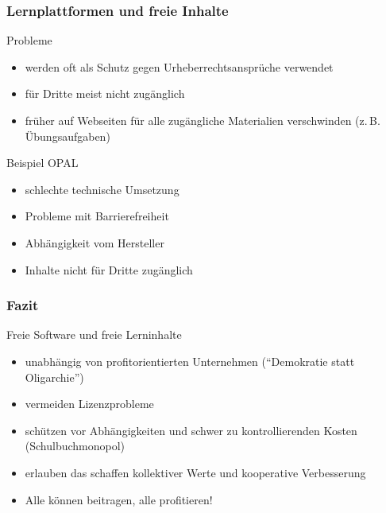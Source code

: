\documentclass{beamer}
\begin{document}
\begin{frame}
  \frametitle{Lernplattformen und freie Inhalte}
  \begin{block}{Probleme}
    \begin{itemize}
    \item werden oft als Schutz gegen Urheberrechtsansprüche verwendet
    \item für Dritte meist nicht zugänglich
    \item früher auf Webseiten für alle zugängliche Materialien
      verschwinden (z.\,B. Übungsaufgaben)
    \end{itemize}
  \end{block}

  \begin{block}{Beispiel OPAL}
    \begin{itemize}
    \item schlechte technische Umsetzung
    \item Probleme mit Barrierefreiheit
    \item Abhängigkeit vom Hersteller
    \item Inhalte nicht für Dritte zugänglich
    \end{itemize}
  \end{block}

\end{frame}

\begin{frame}
  \frametitle{Fazit}
  \begin{block}{Freie Software und freie Lerninhalte}
    \begin{itemize}
    \item unabhängig von profitorientierten Unternehmen
      (\enquote{Demokratie statt Oligarchie})
    \item vermeiden Lizenzprobleme
    \item schützen vor Abhängigkeiten und schwer zu kontrollierenden Kosten
      (Schulbuchmonopol)
    \item erlauben das schaffen kollektiver Werte und kooperative
      Verbesserung
    \item Alle können beitragen, alle profitieren!
    \end{itemize}
  \end{block}

\end{frame}
\end{document}
